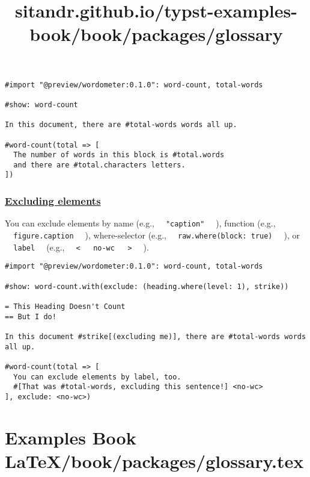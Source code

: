 \begin{verbatim}
#import "@preview/wordometer:0.1.0": word-count, total-words

#show: word-count

In this document, there are #total-words words all up.

#word-count(total => [
  The number of words in this block is #total.words
  and there are #total.characters letters.
])
\end{verbatim}

\pandocbounded{}

\subsubsection{\texorpdfstring{\hyperref[excluding-elements]{Excluding
elements}}{Excluding elements}}\label{excluding-elements}

You can exclude elements by name (e.g.,
\texttt{\ }{\texttt{\ "caption"\ }}\texttt{\ } ), function (e.g.,
\texttt{\ }{\texttt{\ figure.caption\ }}\texttt{\ } ), where-selector
(e.g., \texttt{\ }{\texttt{\ raw.where(block:\ true)\ }}\texttt{\ } ),
or \texttt{\ }{\texttt{\ label\ }}\texttt{\ } (e.g.,
\texttt{\ }{\texttt{\ \textless{}\ }}\texttt{\ }{\texttt{\ no-wc\ }}\texttt{\ }{\texttt{\ \textgreater{}\ }}\texttt{\ }
).

\begin{verbatim}
#import "@preview/wordometer:0.1.0": word-count, total-words

#show: word-count.with(exclude: (heading.where(level: 1), strike))

= This Heading Doesn't Count
== But I do!

In this document #strike[(excluding me)], there are #total-words words all up.

#word-count(total => [
  You can exclude elements by label, too.
  #[That was #total-words, excluding this sentence!] <no-wc>
], exclude: <no-wc>)
\end{verbatim}

\pandocbounded{}


\section{Examples Book LaTeX/book/packages/glossary.tex}
\title{sitandr.github.io/typst-examples-book/book/packages/glossary}

